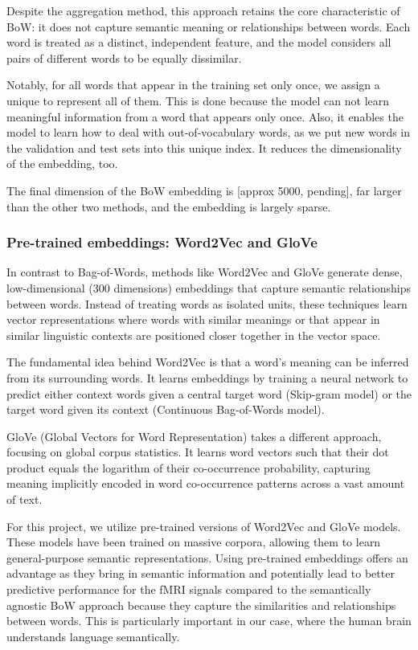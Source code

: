 \documentclass[10pt,letterpaper]{article}
\begin{document}
Despite the aggregation method, this approach retains the core characteristic of BoW: it does not capture semantic meaning or relationships between words. Each word is treated as a distinct, independent feature, and the model considers all pairs of different words to be equally dissimilar.

Notably, for all words that appear in the training set only once, we assign a unique to represent all of them. This is done because the model can not learn meaningful information from a word that appears only once. Also, it enables the model to learn how to deal with out-of-vocabulary words, as we put new words in the validation and test sets into this unique index. It reduces the dimensionality of the embedding, too.

The final dimension of the BoW embedding is [approx 5000, pending], far larger than the other two methods, and the embedding is largely sparse.

\subsubsection{Pre-trained embeddings: Word2Vec and GloVe}
In contrast to Bag-of-Words, methods like Word2Vec \cite{mikolov2013efficient} and GloVe \cite{pennington2014glove} generate dense, low-dimensional (300 dimensions) embeddings that capture semantic relationships between words. Instead of treating words as isolated units, these techniques learn vector representations where words with similar meanings or that appear in similar linguistic contexts are positioned closer together in the vector space.

The fundamental idea behind Word2Vec is that a word's meaning can be inferred from its surrounding words. It learns embeddings by training a neural network to predict either context words given a central target word (Skip-gram model) or the target word given its context (Continuous Bag-of-Words model).

GloVe (Global Vectors for Word Representation) takes a different approach, focusing on global corpus statistics. It learns word vectors such that their dot product equals the logarithm of their co-occurrence probability, capturing meaning implicitly encoded in word co-occurrence patterns across a vast amount of text.

For this project, we utilize pre-trained versions of Word2Vec and GloVe models. These models have been trained on massive corpora, allowing them to learn general-purpose semantic representations. Using pre-trained embeddings offers an advantage as they bring in semantic information and potentially lead to better predictive performance for the fMRI signals compared to the semantically agnostic BoW approach because they capture the similarities and relationships between words. This is particularly important in our case, where the human brain understands language semantically.
\end{document}
